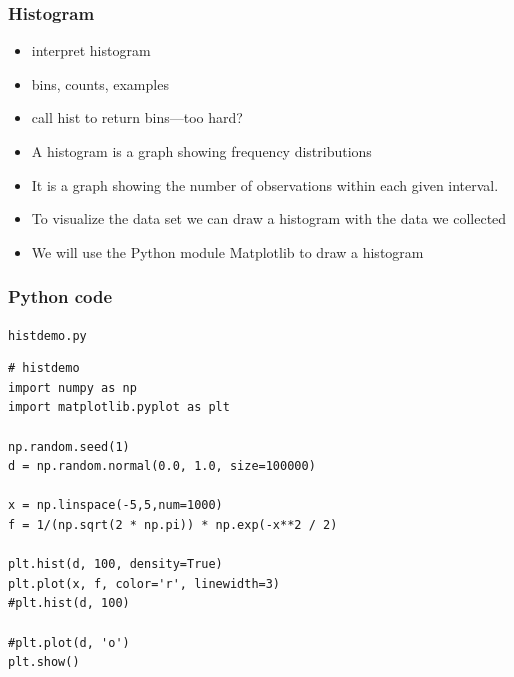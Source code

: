 \documentclass[english,14pt]{beamer}
\begin{document}
\begin{frame}[fragile]

\frametitle{Histogram}

\begin{itemize}
	\item interpret histogram
	\item bins, counts, examples
	\item call hist to return bins---too hard?
\end{itemize}

\begin{itemize}
	\item A histogram is a graph showing frequency distributions
	\item It is a graph showing the number of observations within each given interval.
	\item To visualize the data set we can draw a histogram with the data we collected
	\item We will use the Python module Matplotlib to draw a histogram
\end{itemize}

\end{frame}


\begin{frame}[fragile]

\frametitle{Python code}

\texttt{histdemo.py}
\begin{lstlisting}[style=CStyle,basicstyle=\scriptsize]
# histdemo
import numpy as np
import matplotlib.pyplot as plt

np.random.seed(1)
d = np.random.normal(0.0, 1.0, size=100000)

x = np.linspace(-5,5,num=1000)
f = 1/(np.sqrt(2 * np.pi)) * np.exp(-x**2 / 2)

plt.hist(d, 100, density=True)
plt.plot(x, f, color='r', linewidth=3)
#plt.hist(d, 100)

#plt.plot(d, 'o')
plt.show()
\end{lstlisting}


\end{frame}

\end{document}
